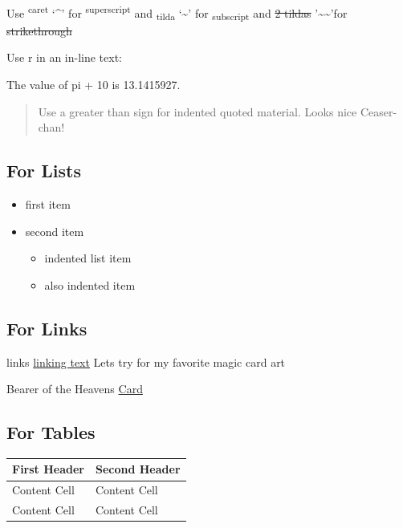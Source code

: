 \documentclass[
]{article}
\providecommand{\tightlist}{%
  \setlength{\itemsep}{0pt}\setlength{\parskip}{0pt}}
\begin{document}
Use \textsuperscript{caret} `\^{}' for \textsuperscript{superscript} and
\textsubscript{tilda} `\textasciitilde{}' for \textsubscript{subscript}
and \st{2 tildas} '\textasciitilde\textasciitilde'for \st{strikethrough}

Use r in an in-line text:

The value of pi + 10 is 13.1415927.

\begin{quote}
Use a greater than sign for indented quoted material. Looks nice
Ceaser-chan!
\end{quote}

\subsection{For Lists}\label{for-lists}

\begin{itemize}
\tightlist
\item
  first item
\item
  second item

  \begin{itemize}
  \tightlist
  \item
    indented list item
  \item
    also indented item
  \end{itemize}
\end{itemize}

\subsection{For Links}\label{for-links}

links \href{website\%20address}{linking text} Lets try for my favorite
magic card art

Bearer of the Heavens
\href{https://gatherer.wizards.com/pages/card/details.aspx?name=Bearer\%20of\%20the\%20Heavens}{Card}

\subsection{For Tables}\label{for-tables}

\begin{longtable}[]{@{}ll@{}}
\toprule\noalign{}
First Header & Second Header \\
\midrule\noalign{}
\endhead
\bottomrule\noalign{}
\endlastfoot
Content Cell & Content Cell \\
Content Cell & Content Cell \\
\end{longtable}
\end{document}
